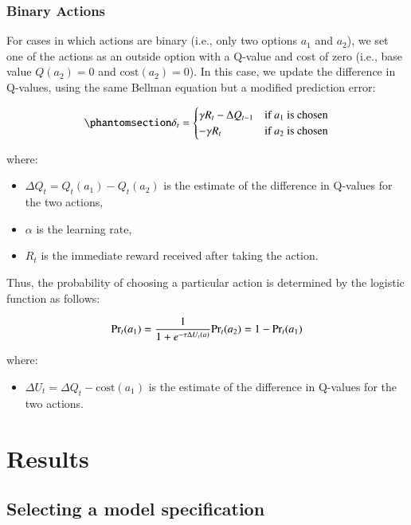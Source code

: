 \documentclass[
  number,
  preprint,
  3p,
  onecolumn]{elsarticle}
\providecommand{\tightlist}{%
  \setlength{\itemsep}{0pt}\setlength{\parskip}{0pt}}\usepackage{longtable,booktabs,array}
\begin{document}
\subsubsection{Binary Actions}\label{binary-actions}

For cases in which actions are binary (i.e., only two options \(a_1\)
and \(a_2\)), we set one of the actions as an outside option with a
Q-value and cost of zero (i.e., base value \(Q(a_2)=0\) and
\(\text{cost}(a_2)=0\)). In this case, we update the difference in
Q-values, using the same Bellman equation but a modified prediction
error:

\begin{equation}\phantomsection\label{eq-state-free}{
\delta_t =
\begin{cases}
\gamma R_t - \Delta Q_{t-1} & \text{if } a_1 \text{ is chosen} \\
-\gamma R_t & \text{if } a_2 \text{ is chosen}
\end{cases}
}\end{equation}

where:

\begin{itemize}
\item
  \(\Delta Q_{t}=Q_{t}(a_1)-Q_{t}(a_2)\) is the estimate of the
  difference in Q-values for the two actions,
\item
  \(\alpha\) is the learning rate,
\item
  \(R_t\) is the immediate reward received after taking the action.
\end{itemize}

Thus, the probability of choosing a particular action is determined by
the logistic function as follows:

\[
\text{Pr}_t(a_1) = \frac{1}{1+e^{-\tau \Delta U_{t}(a)}}
\\
\text{Pr}_t(a_2) = 1 - \text{Pr}_t(a_1)
\]

where:

\begin{itemize}
\tightlist
\item
  \(\Delta U_{t}=\Delta Q_{t} - \text{cost}(a_1)\) is the estimate of
  the difference in Q-values for the two actions.
\end{itemize}

\section{Results}\label{results}

\subsection{Selecting a model
specification}\label{selecting-a-model-specification}
\end{document}
